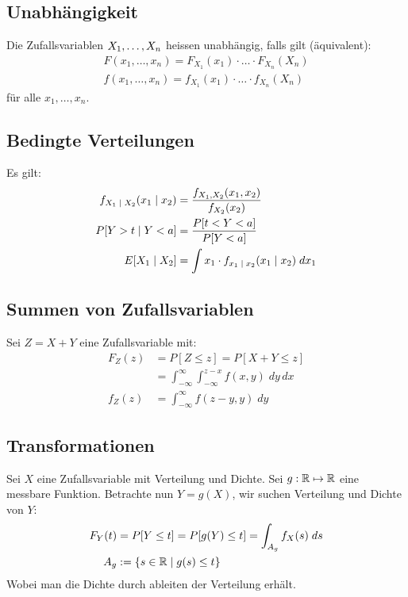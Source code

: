 \BoxEnd{}
\subsection{Unabhängigkeit}
Die Zufallsvariablen $X_1, \dots, X_n$ heissen unabhängig, falls gilt
(äquivalent):
\begin{align*}
  F (x_1, \dots, x_n) = F_{X_1} (x_1) \cdot \hdots \cdot F_{X_n} (X_n) \\
  f (x_1, \dots, x_n) = f_{X_1} (x_1) \cdot \hdots \cdot f_{X_n} (X_n)
\end{align*}
für alle $x_1, \dots, x_n$.
\subsection{Bedingte Verteilungen}
Es gilt:
\begin{align*}
  f_{X_1 \; | \; X_2} (x_1 \; | \; x_2) & = \frac{f_{X_1,  X_2} (x_1,  x_2)}{f_{X_2} (x_2)}              \\
  P[Y > t \; | \; Y < a]                   & = \frac{P[t < Y < a]}{P[Y < a]}                                \\
  E[X_1 \; | \; X_2]                    & = \int x_1 \cdot f_{x_1 \; | \; x_2} (x_1 \; | \; x_2) \; dx_1
\end{align*}
\subsection{Summen von Zufallsvariablen}
Sei $Z = X + Y$ eine Zufallsvariable mit:
\begin{align*}
  F_Z (z) & = P[Z \leq z] = P[X + Y \leq z]                                     \\
          & = \int_{-\infty}^\infty \int_{-\infty}^{z - x} f (x, y )\; dy \, dx \\
  f_Z (z) & = \int_{-\infty}^\infty f (z - y, y) \; dy
\end{align*}
\subsection{Transformationen}
Sei $X$ eine Zufallsvariable mit Verteilung und Dichte. Sei $g: \mathbb{R} \mapsto \mathbb{R}$
eine messbare Funktion. Betrachte nun $Y = g (X)$, wir suchen Verteilung und
Dichte von $Y$:
\begin{align*}
  F_Y (t) & = P[Y \leq t] = P[g (Y) \leq t] = \int_{A_g} f_X (s) \; ds \\
  A_g     & := \{s \in \mathbb{R} \; | \; g (s) \leq t\}
\end{align*}
Wobei man die Dichte durch ableiten der Verteilung erhält.
